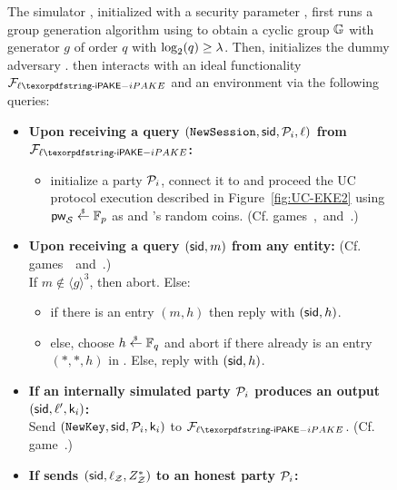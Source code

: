\begin{figure}[ht!]
  \centering
  \begin{fboxenv}
    \begin{minipage}{0.95\textwidth}
      The simulator \Sim, initialized with a security parameter \SEC, first runs a group generation algorithm using \SEC to obtain a cyclic group $\mathbb{G}$ with generator $g$ of order $q$ with $\log_2(q) \geq \lambda$. 
      Then, \Sim initializes the dummy adversary \AdvA.     
      \Sim then interacts with an ideal functionality $\FliPAKE$ and an environment \Env via the following queries:\\[-1.8em]
      \begin{itemize}
      \item
        \textbf{Upon receiving a query
        $(\texttt{NewSession},\mathsf{sid},\mathcal{P}_{i},\ell)$ from $\FliPAKE$:}
        \begin{itemize}
          \item initialize a party $\mathcal{P}_{i}$, connect it to \AdvA and proceed the UC protocol execution described in Figure~\ref{fig:UC-EKE2} using $\mathsf{pw}_{\mathcal{S}}\stackrel{{}_\$}{\leftarrow}\mathbb{F}_{p}$ as \password and \Sim's random coins. (Cf. games~,~and~.)
        \end{itemize}
      \item
        \textbf{Upon receiving a query
        $(\mathsf{sid},m)$ from any entity:} (Cf. games~~and~.)\\
        If $m\notin \langle g\rangle^3$, then abort. Else:
        \begin{itemize}
          \item if there is an entry $(m,h)$ then reply with $(\mathsf{sid},h)$. 
          \item else, choose $h\stackrel{{}_\$}{\leftarrow}\mathbb{F}_q$ and abort if there already is an entry $(*,*,h)$ in \ListRO. Else, reply with $(\mathsf{sid},h)$.
        \end{itemize}
      \item
        \textbf{If an internally simulated party $\mathcal{P}_{i}$ produces an output 
        $(\mathsf{sid},\ell',\mathsf{k}_{i})$:}\\
        Send $(\texttt{NewKey},\mathsf{sid},\mathcal{P}_{i},\mathsf{k}_{i})$ to $\FliPAKE$. (Cf. game~.)
      \item
        \textbf{If \Env sends $(\mathsf{sid},\ell_\mathcal{Z},Z^*_\mathcal{Z})$ to an honest party $\mathcal{P}_{i}$:}

\end{itemize}
\end{minipage}
\end{fboxenv}
\end{figure}
